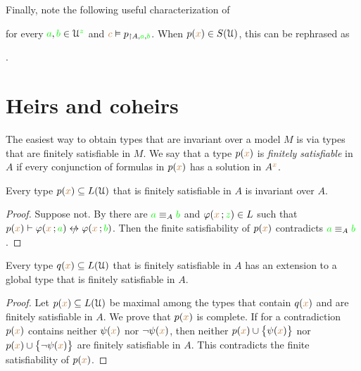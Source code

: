 Finally, note the following useful characterization of 


for every ${\color{green} a},{\color{green} b}\in\EuScript U^{\color{green} z}$ and ${\color{brown} c}\vDash p_{\restriction A,{\color{green} a},{\color{green} b}}$.
When $p({\color{brown} x})\in S(\EuScript U)$, this can be rephrased as

.

\section{Heirs and coheirs}
\label{coheirs}

\def\medrel#1{\parbox[t]{6ex}{$\displaystyle\hfil #1$}}
\def\ceq#1#2#3{\parbox[t]{16ex}{$\displaystyle #1$}\medrel{#2}{$\displaystyle #3$}}

The easiest way to obtain types that are invariant over a model $M$ is via types that are finitely satisfiable in $M$.
We say that a type $p({\color{brown} x})$ is \emph{finitely satisfiable\/} in $A$ if every conjunction of formulas in $p({\color{brown} x})$ has a solution in $A^{\color{brown} x}$.

\begin{proposition}\label{prop_coeredi_quasiinvarienti}
  Every type $p({\color{brown} x})\subseteq L(\EuScript U)$ that is finitely satisfiable in $A$ is invariant over $A$.
\end{proposition}

\begin{proof}
  Suppose not.
  By  there are ${\color{green} a}\equiv_A{\color{green} b}$ and $\varphi({\color{brown} x}\,;{\color{green} z})\in L$ such that $p({\mr x})\proves\phi({\mr x}\,;{\gr a})\niff\phi({\mr x}\,;{\gr b})$.
  Then the finite satisfiability of $p({\color{brown} x})$ contradicts ${\color{green} a}\equiv_A{\color{green} b}$.
\end{proof}

\begin{proposition}\label{prop_exisntence_coheirs}
  Every type $q({\color{brown} x})\subseteq L(\EuScript U)$ that is finitely satisfiable in $A$ has an extension to a global type that is finitely satisfiable in $A$.
\end{proposition}

\begin{proof}
  Let $p({\color{brown} x})\subseteq L(\EuScript U)$ be maximal among the types that contain $q({\color{brown} x})$ and are finitely satisfiable in $A$.
  We prove that $p({\color{brown} x})$ is complete.
  If for a contradiction $p({\color{brown} x})$ contains neither $\psi({\color{brown} x})$ nor $\neg\psi({\color{brown} x})$, then  neither $p({\color{brown} x})\cup\big\{\psi({\color{brown} x})\big\}$ nor $p({\color{brown} x})\cup\big\{\neg\psi({\color{brown} x})\big\}$ are finitely satisfiable in $A$.
  This contradicts the finite satisfiability of $p({\color{brown} x})$.
\end{proof}

